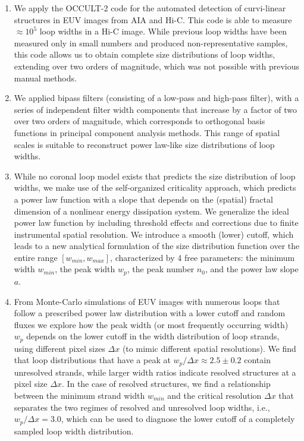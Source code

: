 \documentclass[10pt,preprint]{aastex}  %
\begin{document}
\begin{enumerate}
\item{ We apply the OCCULT-2
code for the automated detection of curvi-linear structures in
EUV images from AIA and Hi-C. This code is able to measure
$\approx 10^5$ loop widths in a Hi-C image. While previous loop
widths have been measured only in small numbers and produced
non-representative samples, this code allows us to obtain complete 
size distributions of loop widths, extending over two orders
of magnitude, which was not possible with previous manual methods.}

\item{ We applied 
bipass filters (consisting of a low-pass and high-pass filter),
with a series of independent filter width components that increase
by a factor of two over two orders of magnitude, which corresponds
to orthogonal basis functions in principal component analysis
methods. This range of spatial scales is suitable to reconstruct
power law-like size distributions of loop widths.}

\item{ While no
coronal loop model exists that predicts the size distribution of
loop widths, we make use of the self-organized criticality approach,
which predicts a power law function with a slope that depends on
the (spatial) fractal dimension of a nonlinear energy dissipation system.
We generalize the ideal power law function by including threshold
effects and corrections due to finite instrumental spatial resolution.
We introduce a smooth (lower) cutoff, which leads to a new analytical
formulation of the size distribution function over the entire range
$[w_{min}, w_{max}]$, characterized by 4 free parameters: the
minimum width $w_{min}$, the peak width $w_p$, the peak number $n_0$, 
and the power law slope $a$.}

\item{ From Monte-Carlo simulations
of EUV images with numerous loops that follow a prescribed power law
distribution with a lower cutoff and random fluxes we explore how
the peak width (or most frequently occurring width) $w_p$ depends
on the lower cutoff in the width distribution of loop strands, using 
different pixel sizes $\Delta x$ (to mimic different spatial resolutions). 
We find that loop distributions that have a peak at $w_p/\Delta x 
\approx 2.5\pm0.2$ contain unresolved strands, while larger
width ratios indicate resolved structures at a pixel size $\Delta x$. 
In the case of resolved structures, we find a relationship between
the minimum strand width $w_{min}$ and the critical resolution $\Delta x$
that separates the two regimes of resolved and unresolved loop widths,
i.e., $w_p/\Delta x = 3.0$, which can be used to diagnose the lower cutoff of a 
completely sampled loop width distribution.}


\end{enumerate}
\end{document}
